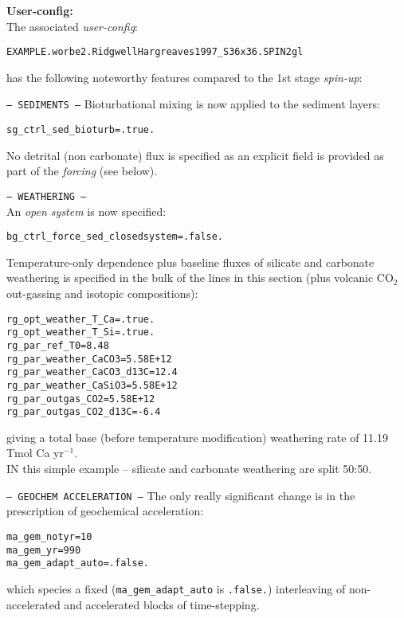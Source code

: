 \documentclass[10pt,twoside]{article}
\begin{document}
\noindent \textbf{User-config:} 
\\ The associated \textit{user-config}:
\vspace{-10pt}\begin{verbatim}EXAMPLE.worbe2.RidgwellHargreaves1997_S36x36.SPIN2gl\end{verbatim}\vspace{-10pt}
has the following noteworthy features compared to the 1st stage \textit{spin-up}:

\begin{compactitem}
                \item \texttt{--- SEDIMENTS ---}
Bioturbational mixing is now applied to the sediment layers:
                \vspace{-5pt}\begin{verbatim}
sg_ctrl_sed_bioturb=.true.
                \end{verbatim}\vspace{-5pt}
No detrital (non carbonate) flux is specified as an explicit field is provided as part of the \textit{forcing} (see below).
                \item \texttt{--- WEATHERING ---}
                \\ An \textit{open  system} is now specified:
\vspace{-5pt}\begin{verbatim}
bg_ctrl_force_sed_closedsystem=.false.
                \end{verbatim}\vspace{-5pt}
                Temperature-only dependence plus baseline fluxes of silicate and carbonate weathering is specified in the bulk of the lines in this section (plus volcanic CO$_{2}$ out-gassing and isotopic compositions):
\vspace{-5pt}\begin{verbatim}
rg_opt_weather_T_Ca=.true.
rg_opt_weather_T_Si=.true.
rg_par_ref_T0=8.48
rg_par_weather_CaCO3=5.58E+12
rg_par_weather_CaCO3_d13C=12.4
rg_par_weather_CaSiO3=5.58E+12 
rg_par_outgas_CO2=5.58E+12
rg_par_outgas_CO2_d13C=-6.4
                \end{verbatim}\vspace{-5pt}
giving a total base (before temperature modification) weathering rate of 11.19 Tmol Ca yr$^{-1}$.
\\ IN this simple example -- silicate and carbonate weathering are split 50:50.  
                \item \texttt{--- GEOCHEM ACCELERATION ---}
The only really significant change is in the prescription of geochemical acceleration:
\vspace{-5pt}\begin{verbatim}
ma_gem_notyr=10
ma_gem_yr=990
ma_gem_adapt_auto=.false.
\end{verbatim}\vspace{-5pt}
which species a fixed (\texttt{ma\_gem\_adapt\_auto} is \texttt{.false.}) interleaving of non-accelerated and accelerated blocks of time-stepping.
        \end{compactitem}
\end{document}
